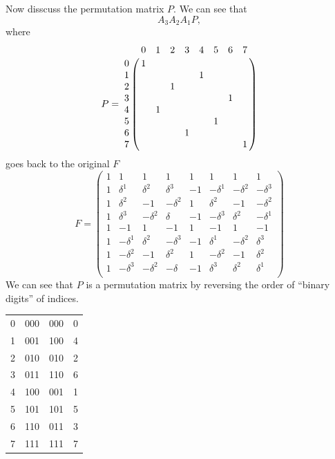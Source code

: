 Now disscuss the permutation matrix $P$. We can see that \[
    A_3 A_2 A_1 P,
\]
where \[
    P = 
    \bordermatrix{
    & 0 & 1 & 2 & 3 & 4 & 5 & 6 & 7\cr
    0&1&&&&&&& \cr
    1&&&&&1&&& \cr
    2&&&1&&&&& \cr
    3&&&&&&&1& \cr
    4&&1&&&&&& \cr
    5&&&&&&1&& \cr
    6&&&&1&&&& \cr
    7&&&&&&&&1
    }
\]
goes back to the original $F$ \[
    F = \begin{pmatrix}
        1 & 1 & 1 & 1 & 1 & 1 & 1 & 1 \\
        1 & \delta^1 & \delta^2 & \delta^3 & -1 & -\delta^1 & -\delta^2 & -\delta^3 \\
        1 & \delta^2 & -1 & -\delta^2 & 1 & \delta^2 & -1 & -\delta^2 \\
        1 & \delta^3 & -\delta^2 & \delta & -1 & -\delta^3 & \delta^2 & -\delta^1 \\
        1 & -1 & 1 & -1 & 1 & -1 & 1 & -1 \\
        1 & -\delta^1 & \delta^2 & -\delta^3 & -1 & \delta^1 & -\delta^2 & \delta^3 \\
        1 & -\delta^2 & -1 & \delta^2 & 1 & -\delta^2 & -1 & \delta^2 \\
        1 & -\delta^3 & -\delta^2 & -\delta & -1 & \delta^3 & \delta^2 & \delta^1 \\  
    \end{pmatrix}
\]
We can see that $P$ is a permutation matrix by reversing the order of ``binary digits'' of indices.
\begin{center}
\begin{tabular}{rrrr}
    0 & 000 & 000 & 0 \\
    1 & 001 & 100 & 4 \\
    2 & 010 & 010 & 2 \\
    3 & 011 & 110 & 6 \\
    4 & 100 & 001 & 1 \\
    5 & 101 & 101 & 5 \\
    6 & 110 & 011 & 3 \\
    7 & 111 & 111 & 7
\end{tabular}
\end{center}

